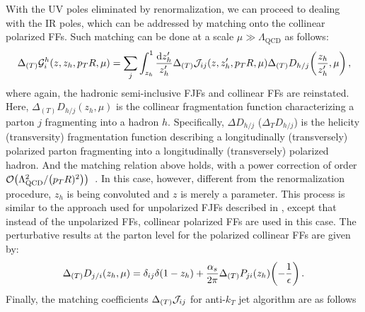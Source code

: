 \documentclass[a4paper, 11 pt]{article}
\begin{document}
With the UV poles eliminated by renormalization, we can proceed to dealing with the IR poles, which can be addressed by matching onto the collinear polarized FFs.
Such matching can be done at a scale $\mu \gg \Lambda _{\mathrm{QCD}}$ as follows:
\begin{equation}
\Delta _{\pqty{T}} \mathcal{G}_i^h \pqty{z, z_h, p_TR,  \mu}
=
\sum _j \int _{z_h}^1 \frac{\dd{z_h'}}{z_h'}
\Delta_{\pqty{T}} \mathcal{J}_{ij} \pqty{z, z_h', p_TR,  \mu}
\Delta _{\pqty{T}} D_{h/j} \pqty{\frac{z_h}{z_h'}, \mu}
\, ,
\end{equation}
where again, the hadronic semi-inclusive FJFs and collinear FFs are reinstated.
Here, $\Delta_{(T)} D_{h/j} (z_h, \mu)$ is the collinear fragmentation function characterizing a parton $j$ fragmenting into a hadron $h$.
Specifically, $\Delta D_{h/j}$ ($\Delta_{T} D_{h/j}$) is the helicity (transversity) fragmentation function describing a longitudinally (transversely) polarized parton fragmenting into a longitudinally (transversely) polarized hadron.
And the matching relation above holds, with a power correction of order $\order{\Lambda _{\mathrm{QCD}}^2 / \pqty{p_TR)^2}}$~\cite{Jain:2011xz, Chien:2015ctp, Kang:2016ehg}.
In this case, however, different from the renormalization procedure, $z_h$ is being convoluted and $z$ is merely a parameter.
This process is similar to the approach used for unpolarized FJFs described in \cite{Kang:2016ehg}, except that instead of the unpolarized FFs, collinear polarized FFs are used in this case.
The perturbative results at the parton level for the polarized collinear FFs are given by:
\begin{equation}
\Delta _{\pqty{T}} D_{j/i} \pqty{z_h, \mu}
=
\delta _{ij} \delta \pqty{1-z_h}
+
\frac{\alpha _s}{2 \pi}
\Delta _{\pqty{T}} P_{ji} \pqty{z_h} 
\pqty{-\frac{1}{\epsilon}}
\, .
\end{equation}
Finally, the matching coefficients $\Delta _{\pqty{T}} \mathcal{J}_{ij}$ for anti-$k_T$ jet algorithm are as follows
\end{document}
